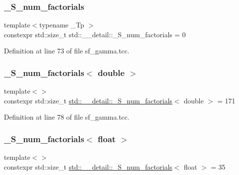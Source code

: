 \subsubsection{\texorpdfstring{\+\_\+\+S\+\_\+num\+\_\+factorials}{\_S\_num\_factorials}}
{\footnotesize\ttfamily template$<$typename \+\_\+\+Tp $>$ \\
constexpr std\+::size\+\_\+t std\+::\+\_\+\+\_\+detail\+::\+\_\+\+S\+\_\+num\+\_\+factorials = 0}



Definition at line 73 of file sf\+\_\+gamma.\+tcc.

\mbox{\label{namespacestd_1_1____detail_ad415b9ec36471d7aca4ebcd22cb7b216}} 
\subsubsection{\texorpdfstring{\+\_\+\+S\+\_\+num\+\_\+factorials$<$ double $>$}{\_S\_num\_factorials< double >}}
{\footnotesize\ttfamily template$<$$>$ \\
constexpr std\+::size\+\_\+t \hyperlink{namespacestd_1_1____detail_a671f3ba94c1b06be87992486bca37426}{std\+::\+\_\+\+\_\+detail\+::\+\_\+\+S\+\_\+num\+\_\+factorials}$<$ double $>$ = 171}



Definition at line 78 of file sf\+\_\+gamma.\+tcc.

\mbox{\label{namespacestd_1_1____detail_a3a29651303ca2222246ef6f0a17e92ec}} 
\subsubsection{\texorpdfstring{\+\_\+\+S\+\_\+num\+\_\+factorials$<$ float $>$}{\_S\_num\_factorials< float >}}
{\footnotesize\ttfamily template$<$$>$ \\
constexpr std\+::size\+\_\+t \hyperlink{namespacestd_1_1____detail_a671f3ba94c1b06be87992486bca37426}{std\+::\+\_\+\+\_\+detail\+::\+\_\+\+S\+\_\+num\+\_\+factorials}$<$ float $>$ = 35}



